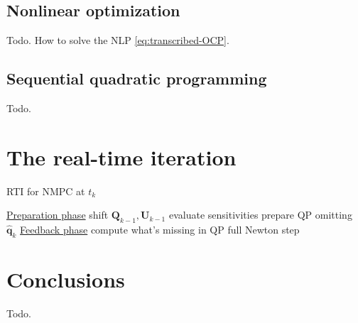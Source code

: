 \subsection{Nonlinear optimization}
Todo. How to solve the NLP \eqref{eq:transcribed-OCP}.

\subsection{Sequential quadratic programming}
Todo.

\section{The real-time iteration}
\begin{algorithm}
	\small
	\caption{RTI for NMPC at $t_k$}
	\label{alg:RTI}
    \underline{Preparation phase}\;
    shift $\bm{Q}_{k-1}, \bm{U}_{k-1}$\;
    evaluate sensitivities\;
    prepare QP omitting $\hat{\bm{q}}_k$\;
    \;
    \underline{Feedback phase}\;
    compute what's missing in QP\;
    full Newton step\;
    \;
\end{algorithm}

\section{Conclusions}
Todo.